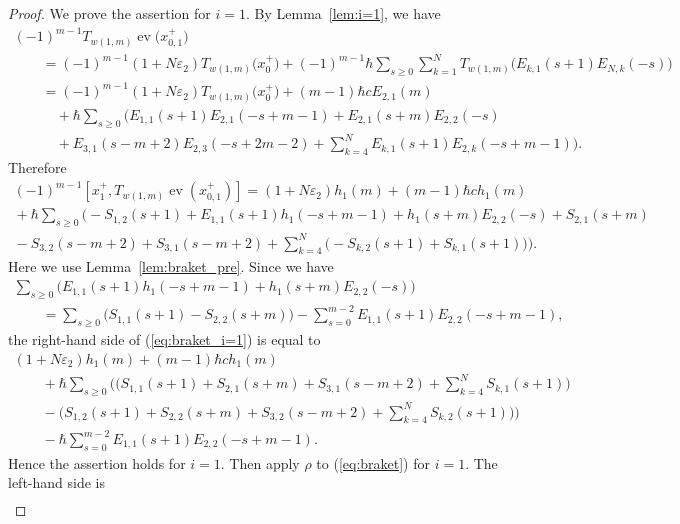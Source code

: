 \documentclass[11pt]{article}
\theoremstyle{definition}
\numberwithin{equation}{section}
\DeclareMathOperator{\ev}{ev}
\newcommand{\ve}{\varepsilon}
\begin{document}
\begin{proof}We prove the assertion for $i=1$. By Lemma~\ref{lem:i=1}, we have
\begin{gather*}
(-1)^{m-1}T_{w(1,m)}\ev\big(x_{0,1}^+\big) \\
 \qquad{} = (-1)^{m-1}(1+N\ve_2)T_{w(1,m)}\big(x_0^+\big) + (-1)^{m-1}\hbar \sum_{s \geq 0} \sum_{k=1}^N T_{w(1,m)}\big(E_{k,1}(s+1)E_{N,k}(-s)\big) \\
\qquad{} =(-1)^{m-1}(1+N\ve_2)T_{w(1,m)}\big(x_0^+\big) + (m-1)\hbar c E_{2,1}(m)\\
\qquad \quad{} + \hbar \sum_{s \geq 0} \bigg( E_{1,1}(s+1)E_{2,1}(-s+m-1) + E_{2,1}(s+m)E_{2,2}(-s) \\
 \qquad \quad{}+ E_{3,1}(s-m+2)E_{2,3}(-s+2m-2) + \sum_{k=4}^N E_{k,1}(s+1)E_{2,k}(-s+m-1) \bigg).
\end{gather*}
Therefore
\begin{gather}
(-1)^{m-1} [x_1^+, T_{w(1,m)} \ev(x_{0,1}^+)] = (1+N\ve_2)h_1(m) + (m-1)\hbar c h_1(m) \nonumber\\
{}+ \hbar \sum_{s \geq 0} \bigg( {-}S_{1,2}(s+1) + E_{1,1}(s+1)h_1(-s+m-1) + h_1(s+m)E_{2,2}(-s) + S_{2,1}(s+m)\nonumber\\
{}-S_{3,2}(s-m+2) + S_{3,1}(s-m+2) + \sum_{k=4}^N \big( {-}S_{k,2}(s+1) + S_{k,1}(s+1) \big) \bigg). \label{eq:braket_i=1}
\end{gather}
Here we use Lemma~\ref{lem:braket_pre}. Since we have
\begin{gather*}
\sum_{s \geq 0} \big( E_{1,1}(s+1)h_1(-s+m-1) + h_1(s+m)E_{2,2}(-s) \big)\\
\qquad {}=\sum_{s \geq 0} \big( S_{1,1}(s+1)-S_{2,2}(s+m) \big) - \sum_{s=0}^{m-2} E_{1,1}(s+1)E_{2,2}(-s+m-1),
\end{gather*}
the right-hand side of (\ref{eq:braket_i=1}) is equal to
\begin{gather*}
(1+N\ve_2)h_1(m) + (m-1)\hbar c h_1(m) \\
\qquad{} + \hbar \sum_{s \geq 0} \bigg( \bigg( S_{1,1}(s+1) + S_{2,1}(s+m) + S_{3,1}(s-m+2) + \sum_{k=4}^N S_{k,1}(s+1) \bigg) \\
\qquad{} - \bigg( S_{1,2}(s+1) + S_{2,2}(s+m) + S_{3,2}(s-m+2) + \sum_{k=4}^N S_{k,2}(s+1) \bigg) \bigg)\\
\qquad{} - \hbar \sum_{s=0}^{m-2} E_{1,1}(s+1)E_{2,2}(-s+m-1).
\end{gather*}
Hence the assertion holds for $i=1$. Then apply $\rho$ to (\ref{eq:braket}) for $i=1$. The left-hand side is
\begin{gather*}

\end{gather*}
\end{proof}
\end{document}

